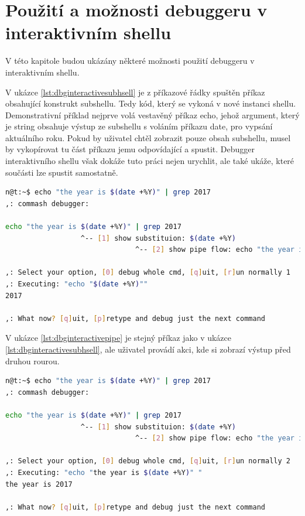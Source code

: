 \documentclass[thesis=M,czech]{FITthesis}[2012/06/26]
\begin{document}
\section{Použití a možnosti debuggeru v interaktivním shellu}

V této kapitole budou ukázány některé možnosti použití debuggeru v interaktivním shellu.

V ukázce \ref{lst:dbginteractivesubhsell} je z příkazové řádky spuštěn příkaz obsahující konstrukt subshellu. Tedy kód, který se vykoná v nové instanci shellu. Demonstrativní příklad nejprve volá vestavěný příkaz echo, jehož argument, který je string obsahuje výstup ze subshellu s voláním příkazu date, pro vypsání aktuálního roku. Pokud by uživatel chtěl zobrazit pouze obsah subshellu, musel by vykopírovat tu část příkazu jemu odpovídající a spustit. Debugger interaktivního shellu však dokáže tuto práci nejen urychlit, ale také ukáže, které součásti lze spustit samostatně.

\begin{minipage}{\linewidth}
\begin{lstlisting}[language=bash, caption={Debugger interaktivního shellu - subshell}, label={lst:dbginteractivesubhsell}]
n@t:~$ echo "the year is $(date +%Y)" | grep 2017
,: commash debugger:

echo "the year is $(date +%Y)" | grep 2017
                  ^-- [1] show substituion: $(date +%Y)
                               ^-- [2] show pipe flow: echo "the year is $(date +%Y)" 

,: Select your option, [0] debug whole cmd, [q]uit, [r]un normally 1
,: Executing: "echo "$(date +%Y)""
2017

,: What now? [q]uit, [p]retype and debug just the next command
\end{lstlisting}
\end{minipage}

V ukázce \ref{lst:dbginteractivepipe} je stejný příkaz jako v ukázce \ref{lst:dbginteractivesubhsell}, ale uživatel provádí akci, kde si zobrazí výstup před druhou rourou.

\begin{minipage}{\linewidth}
\begin{lstlisting}[language=bash, caption={Debugger interaktivního shellu - subshell}, label={lst:dbginteractivepipe}]
n@t:~$ echo "the year is $(date +%Y)" | grep 2017
,: commash debugger:

echo "the year is $(date +%Y)" | grep 2017
                  ^-- [1] show substituion: $(date +%Y)
                               ^-- [2] show pipe flow: echo "the year is $(date +%Y)" 

,: Select your option, [0] debug whole cmd, [q]uit, [r]un normally 2
,: Executing: "echo "the year is $(date +%Y)" "
the year is 2017

,: What now? [q]uit, [p]retype and debug just the next command
\end{lstlisting}
\end{minipage}
\end{document}
